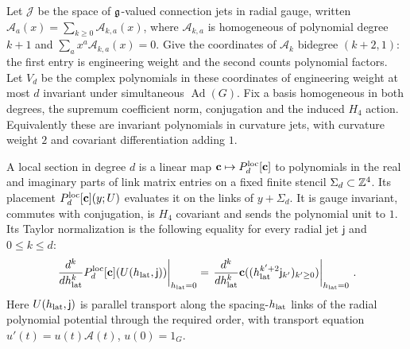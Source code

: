 \begin{definition}\label{def:local-sections}
Let $\mathcal J$ be the space of $\mathfrak{g}$-valued connection jets in radial gauge, written $\mathcal A_a(x)=\sum_{k\ge0}\mathcal A_{k,a}(x)$, where $\mathcal A_{k,a}$ is homogeneous of polynomial degree $k+1$ and $\sum_ax^a\mathcal A_{k,a}(x)=0$. Give the coordinates of $\mathcal A_k$ bidegree $(k+2,1)$: the first entry is engineering weight and the second counts polynomial factors. Let $V_d$ be the complex polynomials in these coordinates of engineering weight at most $d$ invariant under simultaneous $\operatorname{Ad}(G)$. Fix a basis homogeneous in both degrees, the supremum coefficient norm, conjugation and the induced $H_4$ action. Equivalently these are invariant polynomials in curvature jets, with curvature weight $2$ and covariant differentiation adding $1$.

A local section in degree $d$ is a linear map $\mathbf c\mapsto P_{d}^{\mathrm{loc}}[\mathbf c]$ to polynomials in the real and imaginary parts of link matrix entries on a fixed finite stencil $\Sigma_d\subset\mathbb{Z}^4$. Its placement $P_{d}^{\mathrm{loc}}[\mathbf c](y;U)$ evaluates it on the links of $y+\Sigma_d$. It is gauge invariant, commutes with conjugation, is $H_4$ covariant and sends the polynomial unit to $1$. Its Taylor normalization is the following equality for every radial jet $\mathsf j$ and $0\le k\le d$:
\begin{equation}\label{eq:local-taylor}
\left.\frac{d^k}{dh_{\rm lat}^k}P_{d}^{\mathrm{loc}}[\mathbf c](U(h_{\rm lat},\mathsf j))\right|_{h_{\rm lat}=0}
=\left.\frac{d^k}{dh_{\rm lat}^k}\mathbf c((h_{\rm lat}^{k'+2}\mathsf j_{k'})_{k'\ge0})\right|_{h_{\rm lat}=0}\,.
\end{equation}
Here $U(h_{\rm lat},\mathsf j)$ is parallel transport along the spacing-$h_{\rm lat}$ links of the radial polynomial potential through the required order, with transport equation $u'(t)=u(t)\mathcal A(t)$, $u(0)=1_G$.
\end{definition}

